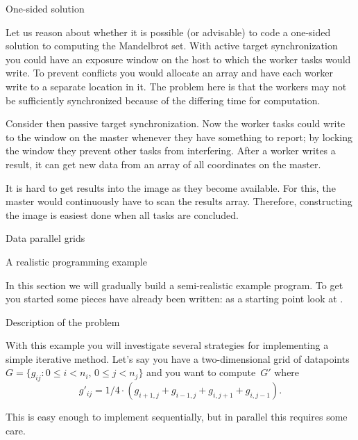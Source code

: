  {One-sided solution}

Let us reason about whether it is possible (or advisable) to code a
one-sided solution to computing the Mandelbrot set.  
%
With active
target synchronization you could have an exposure window on the host
to which the worker tasks would write. To prevent conflicts you would allocate an 
array and have each worker write to a separate location in it.
%
The problem here is that the workers may not be sufficiently synchronized because
of the differing time for computation.

Consider then passive target synchronization. Now the worker tasks could
write to the window on the master whenever they have something to
report; by locking the window they prevent other tasks from interfering.
%
After a worker writes a result, it can get new data from an array
of all coordinates on the master. 

It is hard to get results into the image as they become available. For
this, the master would continuously have to scan the results
array. Therefore, constructing the image is easiest done when all
tasks are concluded.

 {Data parallel grids}

 {A realistic programming example}

In this section we will gradually build a semi-realistic example
program. To get you started some pieces have already been written:
as a starting point look at .

 {Description of the problem}

With this example you will investigate several strategies for
implementing a simple iterative method. Let's say you have a
two-dimensional grid of datapoints $G=\{g_{ij}\colon 0\leq
i<n_i,\,0\leq j<n_j\}$ and you want to compute~$G'$ where
\begin{equation}
g'_{ij} = 1/4 \cdot (g_{i+1,j}+g_{i-1,j}+g_{i,j+1}+g_{i,j-1}).
\label{eq:grid-update}
\end{equation}

This is easy enough to implement sequentially, but in parallel this
requires some care.

